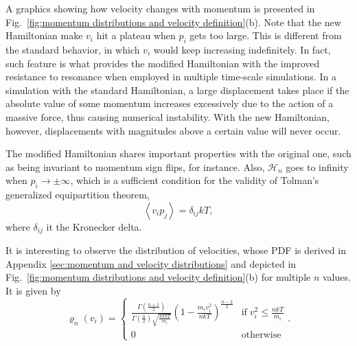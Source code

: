 \documentclass[
aip,
jcp,
reprint,
]{revtex4-1}
\newcommand{\nn}{n}
\begin{document}
A graphics showing how velocity changes with momentum is presented in Fig.~\ref{fig:momentum distributions and velocity definition}(b).
Note that the new Hamiltonian make $v_i$ hit a plateau when $p_i$ gets too large.
This is different from the standard behavior, in which $v_i$ would keep increasing indefinitely.
In fact, such feature is what provides the modified Hamiltonian with the improved resistance to resonance when employed in multiple time-scale simulations.
In a simulation with the standard Hamiltonian, a large displacement takes place if the absolute value of some momentum increases excessively due to the action of a massive force, thus causing numerical instability.
With the new Hamiltonian, however, displacements with magnitudes above a certain value will never occur.

The modified Hamiltonian shares important properties with the original one, such as being invariant to momentum sign flips, for instance.
Also, $\mathcal{H}_n$ goes to infinity when $p_i \to \pm \infty$, which is a sufficient condition \cite{Uline_2008} for the validity of Tolman's generalized equipartition theorem,
\begin{equation}
\label{eq:generalized equipartition}
\left\langle v_i p_j \right\rangle = \delta_{ij} k T,
\end{equation}
where $\delta_{ij}$ it the Kronecker delta.

It is interesting to observe the distribution of velocities, whose PDF is derived in Appendix \ref{sec:momentum and velocity distributions} and depicted in Fig.~\ref{fig:momentum distributions and velocity definition}(b) for multiple $\nn$ values.
It is given by
\begin{equation}
\label{eq:velocity distribution}
\varrho_n(v_i) =
\begin{cases}
\frac{\Gamma\left(\frac{\nn+1}{2}\right)}{\Gamma\left(\frac{\nn}{2}\right) \sqrt{\frac{\nn \pi k T}{m_i}}} \left(1-\frac{m_i v_i^2}{\nn k T}\right)^{\frac{\nn-2}{2}} & \mathrm{if} \; v_i^2 \leq \frac{\nn k T}{m_i} \\
0 & \mathrm{otherwise}
\end{cases}.
\end{equation}
\end{document}
